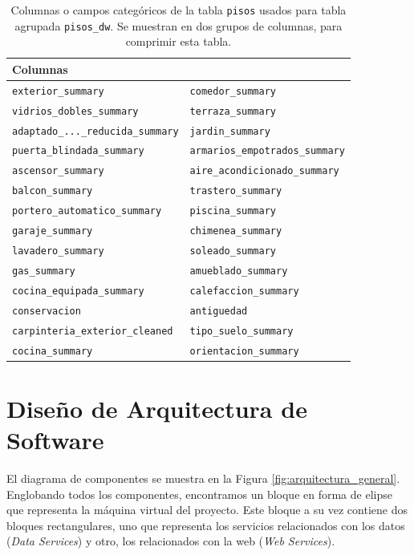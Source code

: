 \begin{table}[h]
\centering
\begin{tabular}{@{}ll@{}}
\toprule
\textbf{Columnas} &  \\
\midrule
\texttt{exterior\_summary} & \texttt{comedor\_summary} \\
\texttt{vidrios\_dobles\_summary} & \texttt{terraza\_summary} \\
\texttt{adaptado\_...\_reducida\_summary} & \texttt{jardin\_summary} \\
\texttt{puerta\_blindada\_summary} & \texttt{armarios\_empotrados\_summary} \\
\texttt{ascensor\_summary} & \texttt{aire\_acondicionado\_summary} \\
\texttt{balcon\_summary} & \texttt{trastero\_summary} \\
\texttt{portero\_automatico\_summary} & \texttt{piscina\_summary} \\
\texttt{garaje\_summary} & \texttt{chimenea\_summary} \\
\texttt{lavadero\_summary} & \texttt{soleado\_summary} \\
\texttt{gas\_summary} & \texttt{amueblado\_summary} \\
\texttt{cocina\_equipada\_summary} & \texttt{calefaccion\_summary} \\
\texttt{conservacion} & \texttt{antiguedad} \\
\texttt{carpinteria\_exterior\_cleaned} & \texttt{tipo\_suelo\_summary} \\
\texttt{cocina\_summary} & \texttt{orientacion\_summary} \\
\bottomrule
\end{tabular}
\caption[Columnas categóricas de la tabla \texttt{pisos} usadas para tabla agrupada \texttt{pisos\_dw}]{Columnas o campos categóricos de la tabla \texttt{pisos} usados para tabla agrupada \texttt{pisos\_dw}. Se muestran en dos grupos de columnas, para comprimir esta tabla.}
\label{tab:categorical_columns_pisosdw}
\end{table}

\clearpage
\section{Diseño de Arquitectura de Software}

El diagrama de componentes se muestra en la Figura \ref{fig:arquitectura_general}. Englobando todos los componentes, encontramos un bloque en forma de elipse que representa la máquina virtual del proyecto. Este bloque a su vez contiene dos bloques rectangulares, uno que representa los servicios relacionados con los datos (\textit{Data Services}) y otro, los relacionados con la web (\textit{Web Services}). 

